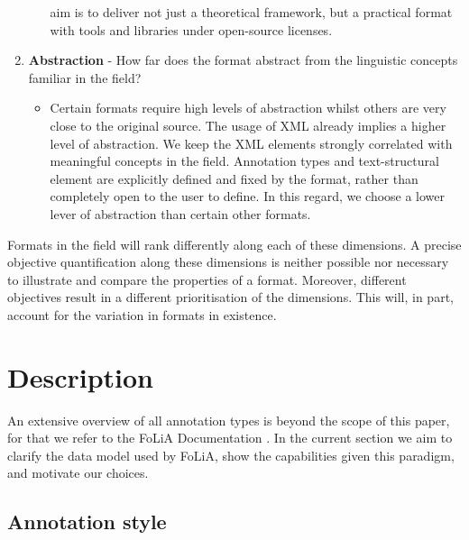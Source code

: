 \documentclass[a4paper,10pt,twoside]{article}
\begin{document}
\begin{enumerate}
\begin{itemize}
      aim is to deliver not just a theoretical framework, but a practical
      format with tools and libraries under open-source licenses.
  \end{itemize}
\item \textbf{Abstraction} - How far does the format abstract from the
  linguistic concepts familiar in the field?
  \begin{itemize}
    \item[] Certain formats require high levels of abstraction whilst others are
      very close to the original source. The usage of XML already implies a higher level of abstraction. We keep
      the XML elements strongly correlated with meaningful concepts in the
      field. Annotation types and text-structural element are explicitly
      defined and fixed by the format, rather than completely open to the user
      to define. In this regard, we choose a lower lever of abstraction than
      certain other formats. 
  \end{itemize}
\end{enumerate}

Formats in the field will rank differently along each of these dimensions. A
precise objective quantification along these dimensions is neither possible nor
necessary to illustrate and compare the properties of a format. Moreover,
different objectives result in a different prioritisation of the dimensions.
This will, in part, account for the variation in formats in existence.


\section{Description}
\label{sec:description}

An extensive overview of all annotation types is beyond the scope of this
paper, for that we refer to the FoLiA Documentation \cite{FOLIA}. In the
current section we aim to clarify the data model used by FoLiA, show the
capabilities given this paradigm, and motivate our choices.

\subsection{Annotation style}
\end{document}
